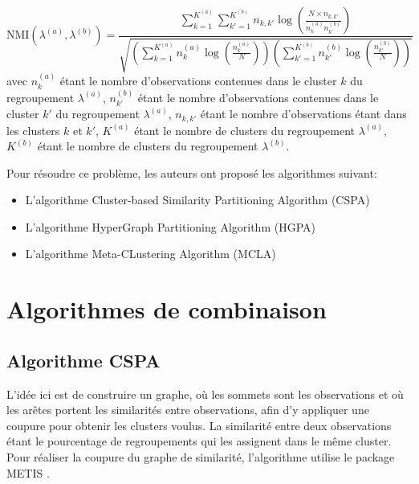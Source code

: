 \documentclass[12pt, french, latin.medieval, a4paper]{report}
\begin{document}
	\begin{equation}
    	\text{NMI}(\lambda^{(a)}, \lambda^{(b)}) = \frac{ \sum_{k=1}^{K^{(a)}} \sum_{k'=1}^{K^{(b)}} n_{k,k'} \log\left( \frac{N \times n_{k,k'}}{ n_k^{(a)} n_{k'}^{(b)} } \right) }{  \sqrt{ \left( \sum_{k=1}^{K^{(a)}} n_k^{(a)}\log( \frac{n_k^{(a)}}{N} )  \right) \left( \sum_{k'=1}^{K^{(b)}} n_{k'}^{(b)} \log( \frac{n_{k'}^{(b)}}{N} )  \right)  } }
   	 \label{equa:enss2}
    \end{equation}
	avec $n_k^{(a)}$ étant le nombre d'observations contenues dans le cluster $k$ du regroupement $\lambda^{(a)}$, $n_{k'}^{(b)}$ étant le nombre d'observations contenues dans le cluster $k'$ du regroupement $\lambda^{(a)}$, $n_{k,k'}$ étant le nombre d'observations étant dans les clusters $k$ et $k'$, $K^{(a)}$ étant le nombre de clusters du regroupement $\lambda^{(a)}$, $K^{(b)}$ étant le nombre de clusters du regroupement $\lambda^{(b)}$.
    
	Pour résoudre ce problème, les auteurs ont proposé les algorithmes suivant:

	\begin{itemize}
    	\item L'algorithme Cluster-based Similarity Partitioning Algorithm (CSPA)
    	\item L'algorithme HyperGraph Partitioning Algorithm (HGPA)
    	\item L'algorithme Meta-CLustering Algorithm (MCLA)
	\end{itemize}

	\section{Algorithmes de combinaison}

	\subsection{Algorithme CSPA}
	L'idée ici est de construire un graphe, où les sommets sont les observations et où les arêtes portent les similarités entre observations, afin d'y appliquer une coupure pour obtenir les clusters voulus.
	La similarité entre deux observations étant le pourcentage de regroupements qui les assignent dans le même cluster.
	Pour réaliser la coupure du graphe de similarité, l'algorithme utilise le package METIS \cite{karypis1998software}.
    
\end{document}
